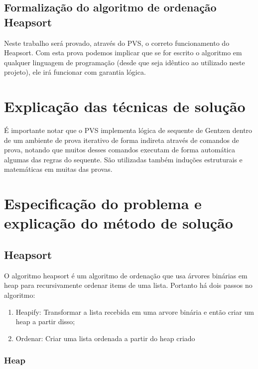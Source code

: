 \section{Formalização do algoritmo de ordenação Heapsort}

Neste trabalho será provado, através do PVS, o correto funcionamento do Heapsort. Com esta prova podemos implicar que se for escrito o algoritmo em qualquer linguagem de programação (desde que seja idêntico ao utilizado neste projeto), ele irá funcionar com garantia lógica.


\chapter{Explicação das técnicas de solução}

É importante notar que o PVS implementa lógica de sequente de Gentzen \cite{pvsbook} dentro de um ambiente de prova iterativo de forma indireta através de comandos de prova, notando que muitos desses comandos  executam de forma automática algumas das regras do sequente. São utilizadas também induções estruturais e matemáticas em muitas das provas.


\chapter{Especificação do problema e explicação do método de solução}

\section{Heapsort}

O algoritmo heapsort é um algoritmo de ordenação que usa árvores binárias em heap para recursivamente ordenar items de uma lista\cite[part II, c6]{introtoalgo}. Portanto há dois passos no algoritmo:

\begin{enumerate}
    \item Heapify: Transformar a lista recebida em uma arvore binária e então criar um heap a partir disso;
    \item Ordenar: Criar uma lista ordenada a partir do heap criado
\end{enumerate}

\subsection{Heap}


